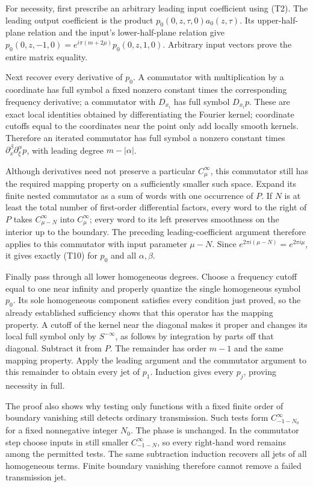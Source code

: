 \documentclass[
  11pt,
]{article}
\begin{document}
For necessity, first prescribe an arbitrary leading input coefficient
using (T2). The leading output coefficient is the product
\(p_0(0,z,\tau,0)a_0(z,\tau)\). Its upper-half-plane relation and the
input's lower-half-plane relation give
\(p_0(0,z,-1,0)=e^{i\pi(m+2\mu)}p_0(0,z,1,0)\). Arbitrary input vectors
prove the entire matrix equality.

Next recover every derivative of \(p_0\). A commutator with
multiplication by a coordinate has full symbol a fixed nonzero constant
times the corresponding frequency derivative; a commutator with
\(D_{x_i}\) has full symbol \(D_{x_i}p\). These are exact local
identities obtained by differentiating the Fourier kernel; coordinate
cutoffs equal to the coordinates near the point only add locally smooth
kernels. Therefore an iterated commutator has full symbol a nonzero
constant times \(\partial_x^\beta\partial_\xi^\alpha p\), with leading
degree \(m-|\alpha|\).

Although derivatives need not preserve a particular \(C_\mu^\infty\),
this commutator still has the required mapping property on a
sufficiently smaller such space. Expand its finite nested commutator as
a sum of words with one occurrence of \(P\). If \(N\) is at least the
total number of first-order differential factors, every word to the
right of \(P\) takes \(C_{\mu-N}^\infty\) into \(C_\mu^\infty\); every
word to its left preserves smoothness on the interior up to the
boundary. The preceding leading-coefficient argument therefore applies
to this commutator with input parameter \(\mu-N\). Since
\(e^{2\pi i(\mu-N)}=e^{2\pi i\mu}\), it gives exactly (T10) for \(p_0\)
and all \(\alpha,\beta\).

Finally pass through all lower homogeneous degrees. Choose a frequency
cutoff equal to one near infinity and properly quantize the single
homogeneous symbol \(p_0\). Its sole homogeneous component satisfies
every condition just proved, so the already established sufficiency
shows that this operator has the mapping property. A cutoff of the
kernel near the diagonal makes it proper and changes its local full
symbol only by \(S^{-\infty}\), as follows by integration by parts off
that diagonal. Subtract it from \(P\). The remainder has order \(m-1\)
and the same mapping property. Apply the leading argument and the
commutator argument to this remainder to obtain every jet of \(p_1\).
Induction gives every \(p_j\), proving necessity in full.

The proof also shows why testing only functions with a fixed finite
order of boundary vanishing still detects ordinary transmission. Such
tests form \(C_{-1-N_0}^\infty\) for a fixed nonnegative integer
\(N_0\). The phase is unchanged. In the commutator step choose inputs in
still smaller \(C_{-1-N}^\infty\), so every right-hand word remains
among the permitted tests. The same subtraction induction recovers all
jets of all homogeneous terms. Finite boundary vanishing therefore
cannot remove a failed transmission jet.
\end{document}
